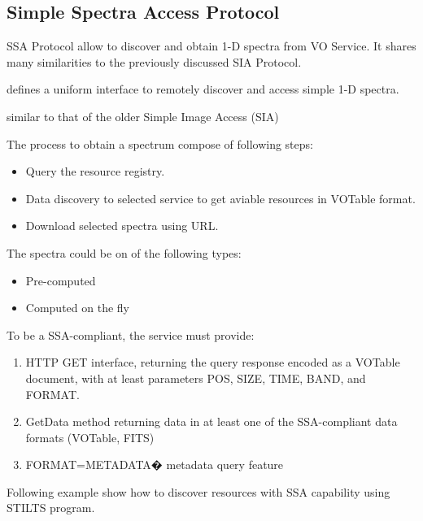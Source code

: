 

 

\subsection{Simple Spectra Access Protocol}

SSA Protocol allow to discover and obtain 1-D spectra from VO
Service. It shares many similarities to the previously discussed SIA
Protocol.

defines a uniform interface to remotely discover and access simple 1-D spectra. 

similar to that of the older Simple Image Access (SIA)

The process to obtain a spectrum compose of following steps:

\begin{itemize}
\item Query the resource registry.
\item Data discovery to selected service to get aviable resources in
  VOTable format.
\item Download selected spectra using URL.
\end{itemize}

The spectra could be on of the following types:

\begin{itemize}
\item Pre-computed
\item Computed on the fly
\end{itemize}

To be a SSA-compliant, the service must provide:

\begin{enumerate}
\item HTTP GET interface, returning the query response encoded as a
VOTable document, with at least parameters POS, SIZE, TIME, BAND, and FORMAT.
\item GetData method returning data in at least one of the
  SSA-compliant data formats (VOTable, FITS)
\item FORMAT=METADATA� metadata query feature
\end{enumerate}


Following example show how to discover resources with SSA capability
using STILTS program. 

